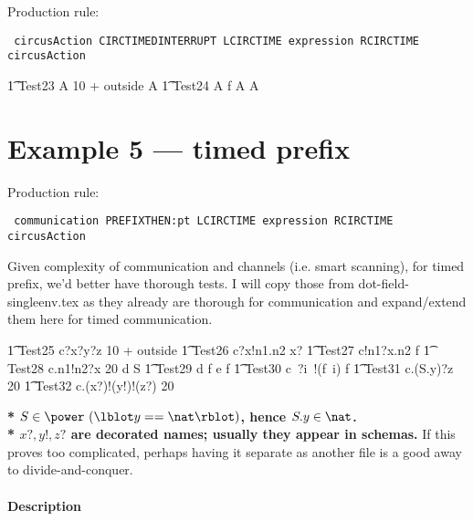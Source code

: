 \documentclass{article}
\newcommand{\lcirctime}{\zopenop{(}}
\newcommand{\rcirctime}{\zcloseop{)}}
\newcommand{\circtimedinterrupt}{\zbinop{interrupt}}
\begin{document}
Production rule:
\begin{verbatim}
 circusAction CIRCTIMEDINTERRUPT LCIRCTIME expression RCIRCTIME circusAction
\end{verbatim}

\begin{circusaction}
   \t1 Test23 \circdef A \circtimedinterrupt \lcirctime 10 + outside \rcirctime A
   \also
   \t1 Test24 \circdef A \circtimedinterrupt \lcirctime f \rcirctime A \circseq A
\end{circusaction}
				

\section{Example 5 --- timed prefix}

Production rule:
\begin{verbatim}
 communication PREFIXTHEN:pt LCIRCTIME expression RCIRCTIME circusAction
\end{verbatim}

Given complexity of communication and channels (i.e. smart scanning), 
for timed prefix, we'd better have thorough tests. I will copy those from
\textsf{dot-field-singleenv.tex} as they already are thorough for communication
and expand/extend them here for timed communication.
%
\begin{circusaction}
   \t1 Test25 \circdef c?x?y?z \then \lcirctime 10 + outside \rcirctime \Skip
   \also
   \t1 Test26 \circdef c?x!n1.n2 \then \lcirctime x? \rcirctime \Skip 
   \also
   \t1 Test27 \circdef c!n1?x.n2 \then \lcirctime f \rcirctime \Skip
   \also
   \t1 Test28 \circdef c.n1!n2?x \then \lcirctime 20 \rcirctime d \then \lcirctime \theta S \rcirctime \Skip 
   \also
   \t1 Test29 \circdef d \then \lcirctime f \rcirctime e \then \lcirctime f \rcirctime \Skip 
   \also
   \t1 Test30 \circdef c~?i~!(f~i) \then \lcirctime f \rcirctime \Skip
       \also
   \t1 Test31 \circdef c.(S.y)?z \then \lcirctime 20 \rcirctime \Skip
       \also
   \t1 Test32 \circdef c.(x?)!(y!)!(z?) \then \lcirctime 20 \rcirctime \Skip 
\end{circusaction}     
%
\textbf{* $S \in \power~(\lblot y == \nat \rblot)$, hence $S.y \in \nat$.}
\\
\indent \textbf{* $x?, y!, z?$ are decorated names; usually they appear in schemas.}
%
If this proves too complicated, perhaps having it separate as another file 
is a good away to divide-and-conquer.

\paragraph{Description \\ \\}
\end{document}
